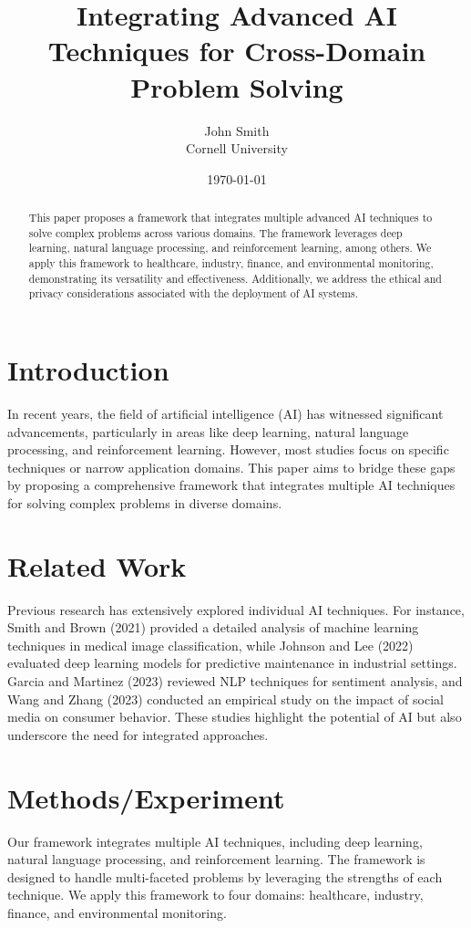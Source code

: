 \documentclass{article}
\title{Integrating Advanced AI Techniques for Cross-Domain Problem Solving}
\author{John Smith \\ Cornell University}
\date{\today}
\begin{document}
\maketitle

\begin{abstract}
This paper proposes a framework that integrates multiple advanced AI techniques to solve complex problems across various domains. The framework leverages deep learning, natural language processing, and reinforcement learning, among others. We apply this framework to healthcare, industry, finance, and environmental monitoring, demonstrating its versatility and effectiveness. Additionally, we address the ethical and privacy considerations associated with the deployment of AI systems.
\end{abstract}

\section{Introduction}
In recent years, the field of artificial intelligence (AI) has witnessed significant advancements, particularly in areas like deep learning, natural language processing, and reinforcement learning. However, most studies focus on specific techniques or narrow application domains. This paper aims to bridge these gaps by proposing a comprehensive framework that integrates multiple AI techniques for solving complex problems in diverse domains.

\section{Related Work}
Previous research has extensively explored individual AI techniques. For instance, Smith and Brown (2021) provided a detailed analysis of machine learning techniques in medical image classification, while Johnson and Lee (2022) evaluated deep learning models for predictive maintenance in industrial settings. Garcia and Martinez (2023) reviewed NLP techniques for sentiment analysis, and Wang and Zhang (2023) conducted an empirical study on the impact of social media on consumer behavior. These studies highlight the potential of AI but also underscore the need for integrated approaches.

\section{Methods/Experiment}
Our framework integrates multiple AI techniques, including deep learning, natural language processing, and reinforcement learning. The framework is designed to handle multi-faceted problems by leveraging the strengths of each technique. We apply this framework to four domains: healthcare, industry, finance, and environmental monitoring.
\end{document}
